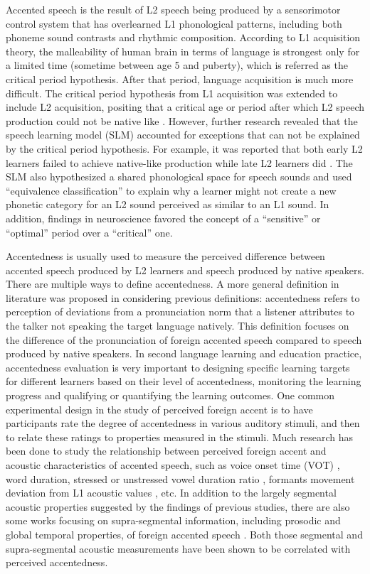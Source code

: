 Accented speech is the result of L2 speech being produced by a sensorimotor control system that has overlearned L1 phonological patterns, including both phoneme sound contrasts and rhythmic composition. According to L1 acquisition theory, the malleability of human brain in terms of language is strongest only for a limited time (sometime between age 5 and puberty), which is referred as the critical period hypothesis. After that period, language acquisition is much more difficult. The critical period hypothesis from L1 acquisition was extended to include L2 acquisition, positing that a critical age or period after which L2 speech production could not be native like \citep{long1990maturational}. However, further research revealed that the speech learning model (SLM) accounted for exceptions that can not be explained by the critical period hypothesis. For example, it was reported that both early L2 learners failed to achieve native-like production while late L2 learners did \citep{flege1995second}. The SLM also hypothesized a shared phonological space for speech sounds and used ``equivalence classification'' to explain why a learner might not create a new phonetic category for an L2 sound perceived as similar to an L1 sound. In addition, findings in neuroscience favored the concept of a ``sensitive'' or ``optimal'' period over a ``critical'' one.

Accentedness is usually used to measure the perceived difference between accented speech produced by L2 learners and speech produced by native speakers. There are multiple ways to define accentedness. A more general definition in literature was proposed in \citep{mccullough2013acoustic} considering previous definitions: accentedness refers to perception of deviations from a pronunciation norm that a listener attributes to the talker not speaking the target language natively. This definition focuses on the difference of the pronunciation of foreign accented speech compared to speech produced by native speakers. In second language learning and education practice, accentedness evaluation is very important to designing specific learning targets for different learners based on their level of accentedness, monitoring the learning progress and qualifying or quantifying the learning outcomes. One common experimental design in the study of perceived foreign accent is to have participants rate the degree of accentedness in various auditory stimuli, and then to relate these ratings to properties measured in the stimuli. Much research has been done to study the relationship between perceived foreign accent and acoustic characteristics of accented speech, such as voice onset time (VOT) \citep{major1987english}, word duration, stressed or unstressed vowel duration ratio \citep{shah2002temporal}, formants movement deviation from L1 acoustic values \citep{munro1993productions}, etc. In addition to the largely segmental acoustic properties suggested by the findings of previous studies, there are also some works focusing on supra-segmental information, including prosodic and global temporal properties, of foreign accented speech \citep{munro2010detection,kang2010relative}. Both those segmental and supra-segmental acoustic measurements have been shown to be correlated with perceived accentedness.

